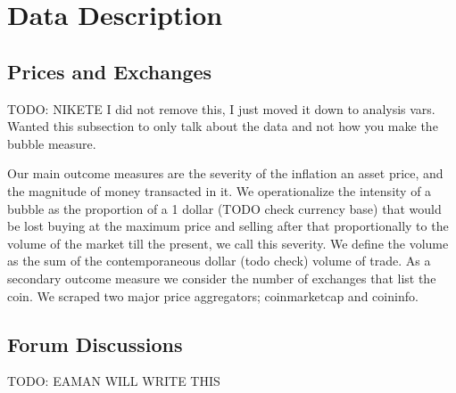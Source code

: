 \section{Data Description}



\subsection{Prices and Exchanges}
TODO: NIKETE I did not remove this, I just moved it down to analysis vars. Wanted this subsection
to only talk about the data and not how you make the bubble measure.

Our main outcome measures are the severity of the inflation an asset price, and the magnitude of money transacted in it.
We operationalize the intensity of a bubble as the proportion of a 1 dollar (TODO check currency base) that would be lost buying at the maximum price and selling after that proportionally to the volume of the market till the present, we call this severity.
We define the volume as the sum of the contemporaneous dollar (todo check) volume of trade.
As a secondary outcome measure we consider the number of exchanges that list the coin.
We scraped two major price aggregators; coinmarketcap and coininfo.


\subsection{Forum Discussions}
TODO: EAMAN WILL WRITE THIS

